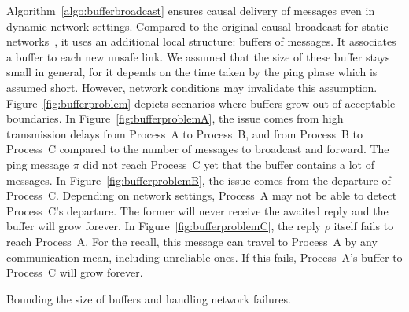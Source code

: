 Algorithm~\ref{algo:bufferbroadcast} ensures causal delivery of messages even in
dynamic network settings. Compared to the original causal broadcast for static
networks~\cite{friedman2004causal}, it uses an additional local structure:
buffers of messages. It associates a buffer to each new unsafe link. We assumed
that the size of these buffer stays small in general, for it depends on the time
taken by the ping phase which is assumed short. However, network conditions may
invalidate this assumption. Figure~\ref{fig:bufferproblem} depicts scenarios
where buffers grow out of acceptable boundaries. In
Figure~\ref{fig:bufferproblemA}, the issue comes from high transmission delays
from Process~A to Process~B, and from Process~B to Process~C compared to the
number of messages to broadcast and forward. The ping message $\pi$ did not
reach Process~C yet that the buffer contains a lot of messages. In
Figure~\ref{fig:bufferproblemB}, the issue comes from the departure of
Process~C. Depending on network settings, Process~A may not be able to detect
Process~C's departure. The former will never receive the awaited reply and the
buffer will grow forever. In Figure~\ref{fig:bufferproblemC}, the reply $\rho$
itself fails to reach Process~A. For the recall, this message can travel to
Process~A by any communication mean, including unreliable ones. If this fails,
Process~A's buffer to Process~C will grow
forever.

\begin{algorithm}
  
  \caption{\label{algo:boundingbuffer}Bounding the size of buffers and handling
    network failures.}
\end{algorithm}

